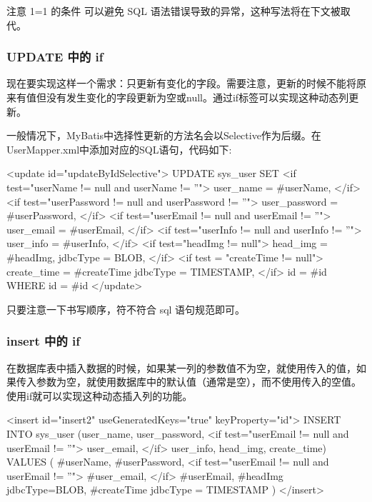 注意 1=1 的条件 可以避免 SQL 语法错误导致的异常，这种写法将在下文被取代。

\subsubsection*{UPDATE 中的 if}

现在要实现这样一个需求：只更新有变化的字段。需要注意，更新的时候不能将原来有值但没有发生变化的字段更新为空或null。通过if标签可以实现这种动态列更新。

一般情况下，MyBatis中选择性更新的方法名会以Selective作为后缀。在UserMapper.xml中添加对应的SQL语句，代码如下:

\begin{xml}
<update id="updateByIdSelective">
    UPDATE sys_user
    SET
    <if test="userName != null and userName != ''">
        user_name = #{userName},
    </if>
    <if test="userPassword != null and userPassword != ''">
        user_password = #{userPassword},
    </if>
    <if test="userEmail != null and userEmail != ''">
        user_email = #{userEmail},
    </if>
    <if test="userInfo != null and userInfo != ''">
        user_info = #{userInfo},
    </if>
    <if test="headImg != null">
        head_img = #{headImg, jdbcType = BLOB},
    </if>
    <if test = "createTime != null">
        create_time = #{createTime jdbcType = TIMESTAMP},
    </if>
    id = #{id}
    WHERE id = #{id}
</update>
\end{xml}

只要注意一下书写顺序，符不符合 sql 语句规范即可。

\subsubsection*{insert 中的 if}

在数据库表中插入数据的时候，如果某一列的参数值不为空，就使用传入的值，如果传入参数为空，就使用数据库中的默认值（通常是空），而不使用传入的空值。使用if就可以实现这种动态插入列的功能。

\begin{xml}
<insert id="insert2" useGeneratedKeys="true" keyProperty="id">
    INSERT INTO sys_user (user_name, user_password,
        <if test="userEmail != null and userEmail != ''">
            user_email,
        </if>
        user_info, head_img, create_time)
    VALUES (
        #{userName}, #{userPassword},
        <if test="userEmail != null and userEmail != ''">
            #{user_email},
        </if>
        #{userEmail}, #{headImg jdbcType=BLOB}, #{createTime jdbcType = TIMESTAMP}
    )
</insert>
\end{xml}

